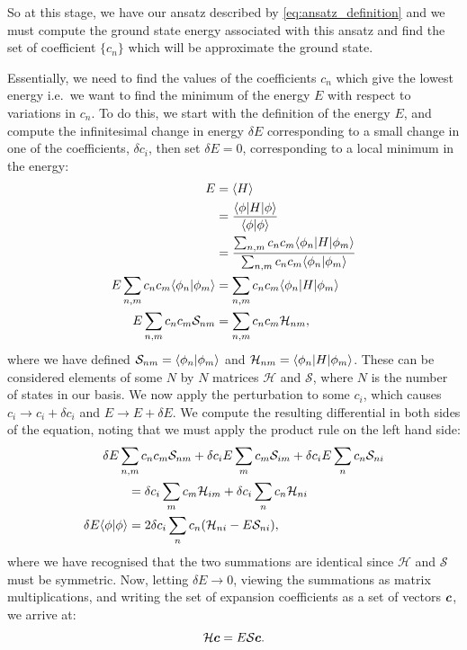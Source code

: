 \documentclass[
  a4paper,             %
  11pt,                %
  oneside,             %
  onecolumn,           %
  bibliography=totoc,  %
  final,               %
]{scrartcl}
\begin{document}
So at this stage, we have our ansatz described by \cref{eq:ansatz_definition}
and we must compute the ground state energy associated with this ansatz and find
the set of coefficient \(\{c_{n}\}\) which will be approximate the ground state.

Essentially, we need to find the values of the coefficients \(c_n\) which give
the lowest energy i.e.~we want to find the minimum of the energy \(E\) with
respect to variations in \(c_n\).  To do this, we start with the definition of
the energy \(E\), and compute the infinitesimal change in energy \(\delta E\)
corresponding to a small change in one of the coefficients, \(\delta c_i\), then
set \(\delta E = 0\), corresponding to a local minimum in the energy:
\begin{subequations}
  \begin{align}
    E &= \angles{H} \\
      &= \frac{\brakket{\phi}{H}{\phi}}{\braket{\phi}{\phi}} \\
      &= \frac{\sum_{n,m} c_n c_m \brakket{\phi_n}{H}{\phi_m}}{\sum_{n,m} c_nc_m \braket{\phi_n}{\phi_m}} \\
    E \sum_{n,m} c_nc_m \braket{\phi_n}{\phi_m} &= \sum_{n,m} c_n c_m \brakket{\phi_n}{H}{\phi_m} \\
    E \sum_{n,m} c_nc_m \mathcal{S}_{nm} &= \sum_{n,m} c_n c_m \mathcal{H}_{nm},
  \end{align}
\end{subequations}
where we have defined \(\mathcal{S}_{nm} = \braket{\phi_n}{\phi_m}\) and
\(\mathcal{H}_{nm} = \brakket{\phi_n}{H}{\phi_m}\).  These can be considered
elements of some \(N\) by \(N\) matrices \(\mathcal{H}\) and \(\mathcal{S}\),
where \(N\) is the number of states in our basis.  We now apply the perturbation
to some \(c_i\), which causes \(c_i \rightarrow c_i + \delta c_i\) and \(E
\rightarrow E + \delta E\).  We compute the resulting differential in both sides
of the equation, noting that we must apply the product rule on the left hand
side:
\begin{subequations}
  \begin{align}
    \MoveEqLeft \delta E \sum_{n,m} c_nc_m \mathcal{S}_{nm} + \delta c_i E\sum_m c_m \mathcal{S}_{im} + \delta c_i E\sum_n c_n \mathcal{S}_{ni} \\
    &= \delta c_i \sum_m c_m \mathcal{H}_{im} + \delta c_i \sum_n c_n \mathcal{H}_{ni} \\
    \delta E \braket{\phi}{\phi} &= 2\delta c_i \sum_n c_n (\mathcal{H}_{ni} - E\mathcal{S}_{ni}),
  \end{align}
\end{subequations}
where we have recognised that the two summations are identical since
\(\mathcal{H}\) and \(\mathcal{S}\) must be symmetric.  Now, letting \(\delta E
\rightarrow 0\), viewing the summations as matrix multiplications, and writing
the set of expansion coefficients as a set of vectors \(\boldsymbol{c}\), we arrive at:
\begin{equation}
  \label{eq:generalized_eigenvalue_equation}
  \mathcal{H}\boldsymbol{c} = E\mathcal{S} \boldsymbol{c}.
\end{equation}
\end{document}
